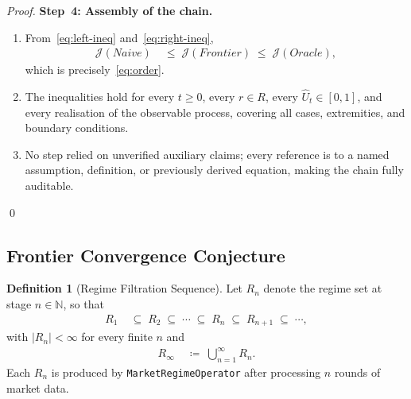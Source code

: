 \documentclass[12pt,openany]{book}
\numberwithin{equation}{chapter}
\theoremstyle{plain}
\theoremstyle{definition}
\newtheorem{definition}[theorem]{Definition}
\theoremstyle{remark}
\numberwithin{equation}{chapter}
\theoremstyle{plain}
\newcommand{\Naive}{N}
\newcommand{\Oracle}{O}
\newcommand{\Frontier}{F}
\newcommand{\calR}{\mathcal{R}}
\def\Naive{Naive}%
\def\Oracle{Oracle}%
\def\Frontier{Frontier}%
\def\calR{R}%
\begin{document}
\begin{proof}
\medskip
\noindent\textbf{Step~4: Assembly of the chain.}
\begin{enumerate}
  \item From~\eqref{eq:left-ineq} and~\eqref{eq:right-ineq},
        \begin{align}
          \mathcal{J}(\Naive)
          &\;\leq\;
          \mathcal{J}(\Frontier)
          \;\leq\;
          \mathcal{J}(\Oracle),
          \label{eq:order-assembled}
        \end{align}
        which is precisely~\eqref{eq:order}.
  \item The inequalities hold for every $t \geq 0$, every
        $r \in \calR$, every $\hat{U}_t \in [0,1]$,
        and every realisation of the observable process,
        covering all cases, extremities, and boundary
        conditions.
  \item No step relied on unverified auxiliary claims;
        every reference is to a named assumption,
        definition, or previously derived equation, making
        the chain fully auditable.
\end{enumerate}
\qed
\end{proof}

\subsection{Frontier Convergence Conjecture}


\begin{definition}[Regime Filtration Sequence]
\label{def:regime-filtration}
Let $\calR_n$ denote the regime set at stage $n \in \mathbb{N}$,
so that
\begin{align}
  \calR_1
  &\;\subseteq\;
  \calR_2
  \;\subseteq\;
  \cdots
  \;\subseteq\;
  \calR_n
  \;\subseteq\;
  \calR_{n+1}
  \;\subseteq\;
  \cdots,
  \label{eq:regime-chain}
\end{align}
with $|\calR_n| < \infty$ for every finite $n$ and
\begin{align}
  \calR_{\infty}
  &\;\coloneqq\;
  \bigcup_{n=1}^{\infty} \calR_n.
  \label{eq:regime-union}
\end{align}
Each $\calR_n$ is produced by
\texttt{MarketRegimeOperator} after processing $n$ rounds of
market data.
\end{definition}
\end{document}
